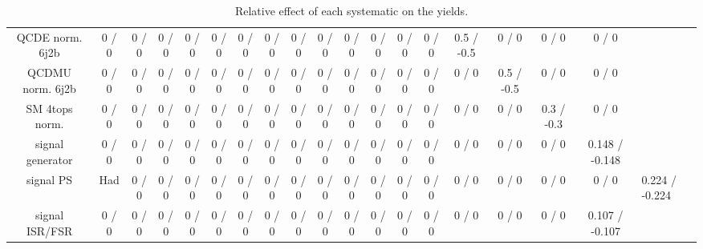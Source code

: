 \documentclass[10pt]{article}
\begin{document}
\begin{table}[htbp]
\begin{center}
\begin{tabular}{|c|c|c|c|c|c|c|c|c|c|c|c|c|c|c|c|c|c|}
  QCDE norm. 6j2b & 0 / 0 & 0 / 0 & 0 / 0 & 0 / 0 & 0 / 0 & 0 / 0 & 0 / 0 & 0 / 0 & 0 / 0 & 0 / 0 & 0 / 0 & 0 / 0 & 0 / 0 & 0.5 / -0.5 & 0 / 0 & 0 / 0 & 0 / 0 \\ 
  QCDMU norm. 6j2b & 0 / 0 & 0 / 0 & 0 / 0 & 0 / 0 & 0 / 0 & 0 / 0 & 0 / 0 & 0 / 0 & 0 / 0 & 0 / 0 & 0 / 0 & 0 / 0 & 0 / 0 & 0 / 0 & 0.5 / -0.5 & 0 / 0 & 0 / 0 \\ 
  SM 4tops norm. & 0 / 0 & 0 / 0 & 0 / 0 & 0 / 0 & 0 / 0 & 0 / 0 & 0 / 0 & 0 / 0 & 0 / 0 & 0 / 0 & 0 / 0 & 0 / 0 & 0 / 0 & 0 / 0 & 0 / 0 & 0.3 / -0.3 & 0 / 0 \\ 
  signal generator & 0 / 0 & 0 / 0 & 0 / 0 & 0 / 0 & 0 / 0 & 0 / 0 & 0 / 0 & 0 / 0 & 0 / 0 & 0 / 0 & 0 / 0 & 0 / 0 & 0 / 0 & 0 / 0 & 0 / 0 & 0 / 0 & 0.148 / -0.148 \\ 
  signal PS & Had & 0 / 0 & 0 / 0 & 0 / 0 & 0 / 0 & 0 / 0 & 0 / 0 & 0 / 0 & 0 / 0 & 0 / 0 & 0 / 0 & 0 / 0 & 0 / 0 & 0 / 0 & 0 / 0 & 0 / 0 & 0 / 0 & 0.224 / -0.224 \\ 
  signal ISR/FSR & 0 / 0 & 0 / 0 & 0 / 0 & 0 / 0 & 0 / 0 & 0 / 0 & 0 / 0 & 0 / 0 & 0 / 0 & 0 / 0 & 0 / 0 & 0 / 0 & 0 / 0 & 0 / 0 & 0 / 0 & 0 / 0 & 0.107 / -0.107 \\ 
\hline 
\end{tabular} 
\caption{Relative effect of each systematic on the yields.} 
\end{center} 
\end{table} 
\end{document}
